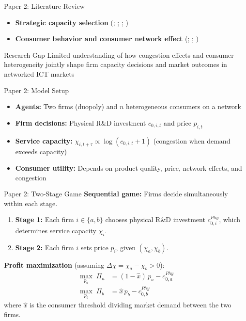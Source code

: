 \documentclass[10pt,aspectratio=169]{beamer}
\begin{document}
\begin{frame}{Paper 2: Literature Review}
\begin{itemize}
    \item \textbf{Strategic capacity selection}\; (\citet{Katz1986ProductProgress}; \citet{Besanko2004CapacitySize}; \citet{Ahuja2016NetworkNetworks}; \citet{Levistky2022StudyNetworks})
    \item \textbf{Consumer behavior and consumer network effect}\; (\citet{Watts1998CollectiveNetworks}; \citet{Jackson2007DiffusionGames};  \citet{Jackson2011AnApplications})
\end{itemize}

\vspace{1mm}
\begin{block}{Research Gap}
Limited understanding of how congestion effects and consumer heterogeneity jointly shape firm capacity decisions and market outcomes in networked ICT markets
\end{block}
\end{frame}

\begin{frame}{Paper 2: Model Setup}
\begin{itemize}
    \item \textbf{Agents:} Two firms (duopoly) and $n$ heterogeneous consumers on a network
    \item \textbf{Firm decisions:} Physical R\&D investment $c_{0,i,t}$ and price $p_{i,t}$
    \item \textbf{Service capacity:} $\chi_{i,t+\tau} \propto \log(c_{0,i,t} + 1)$ (congestion when demand exceeds capacity)
    \item \textbf{Consumer utility:} Depends on product quality, price, network effects, and congestion
\end{itemize}
\end{frame}

\begin{frame}{Paper 2: Two-Stage Game}
\textbf{Sequential game:} Firms decide simultaneously within each stage.
\begin{enumerate}
    \item \textbf{Stage 1:} Each firm $i \in \{a, b\}$ chooses physical R\&D investment $c^{Phy}_{0,i}$, which determines service capacity $\chi_{i}$.
    \item \textbf{Stage 2:} Each firm $i$ sets price $p_{i}$, given $(\chi_a, \chi_b)$.
\end{enumerate}
\vspace{2mm}
\textbf{Profit maximization} (assuming $\Delta\chi = \chi_a - \chi_b > 0$):
\begin{equation*}
\begin{aligned}
    \max_{p_a} \;\Pi_a & = (1-\hat{x})\,p_a - c^{Phy}_{0,a} \\
    \max_{p_b} \;\Pi_b & = \hat{x}\,p_b - c^{Phy}_{0,b}
\end{aligned}
\end{equation*}
where $\hat{x}$ is the consumer threshold dividing market demand between the two firms.
\end{frame}
\end{document}
